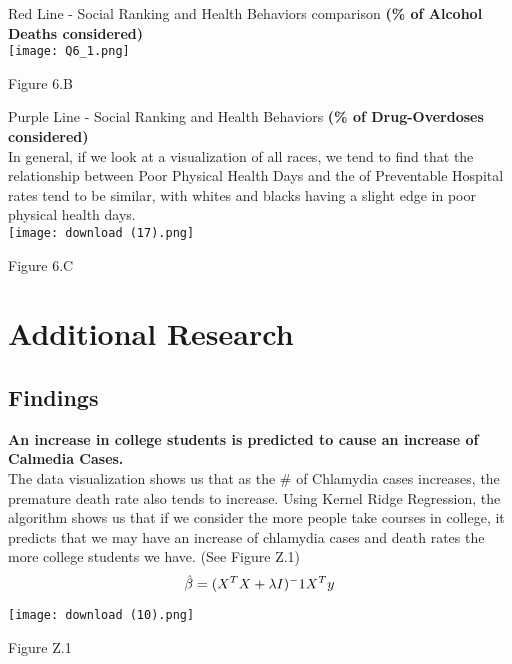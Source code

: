 \documentclass[conference]{IEEEtran}
\begin{document}
Red Line - Social Ranking and Health Behaviors comparison \textbf{(\% of Alcohol Deaths considered)}\\

 \texttt{[image: Q6\_1.png]}
\begin{center}
\footnotesize{Figure 6.B}
\end{center}

Purple Line - Social Ranking and Health Behaviors \textbf{(\% of Drug-Overdoses considered)}\\

In general, if we look at a visualization of all races,
we tend to find that the relationship between Poor Physical Health Days and the
of Preventable Hospital rates tend to be similar, with whites and blacks
having a slight edge in poor physical health days.\\

 \texttt{[image: download (17).png]}
\begin{center}
\footnotesize{Figure 6.C}
\end{center}

\section{Additional Research}

\subsection{Findings}

\textbf{An increase in college students is predicted to cause an increase of Calmedia Cases.}\\

The data visualization shows us that as the # of Chlamydia cases increases,
the premature death rate also tends to increase.
Using Kernel Ridge Regression, the algorithm shows us that if we consider the more people take courses in college, it predicts that we may have an increase of chlamydia cases and death rates the more college students we have. (See Figure Z.1)\\

\begin{equation}
\boldmath{
    \hat{\beta} = (X^T X + \lambda I)^-1 X^T y}
\end{equation}

 \texttt{[image: download (10).png]}
\begin{center}
\footnotesize{Figure Z.1}
\end{center}
\end{document}
